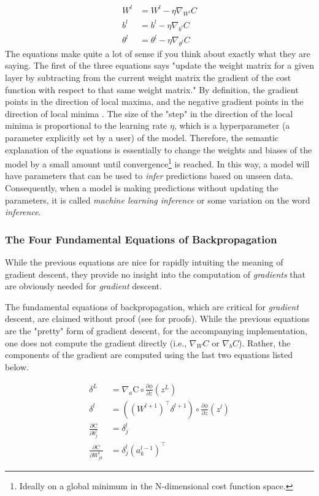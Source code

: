 \documentclass{article}
\begin{document}
\begin{align}
	W^{l}      & = W^{l} - \eta \nabla_{W^{l}}C           \\
	b^{l}      & = b^{l} - \eta \nabla_{b^{l}}C           \\
	\theta^{l} & = \theta^{l} - \eta \nabla_{\theta^{l}}C
\end{align}
The equations make quite a lot of sense if you think about exactly
what they are saying. The first of the three equations says "update the
weight matrix for a given layer by subtracting from the current weight matrix
the gradient of the cost function with respect to that same weight matrix." By definition,
the gradient points in the direction of local maxima, and the
negative gradient points in the direction of local minima \cite{MathLibreGradient2021}.
The size of the "step" in the direction of the local minima
is proportional to the learning rate $\eta$,
which is a hyperparameter (a parameter explicitly set by a user) of the model.
Therefore, the semantic explanation of the equations is essentially to change the
weights and biases of the model by a small amount until convergence\footnote{Ideally
	on a global minimum in the N-dimensional cost function space.} is reached. In this way, a model
will have parameters that can be used to \textit{infer} predictions based on
unseen data. Consequently, when a model is making predictions without
updating the parameters, it is called \textit{machine learning inference} or
some variation on the word \textit{inference}.

\subsubsection{The Four Fundamental Equations of Backpropagation}

\quad While the previous equations are nice for rapidly intuiting the meaning of
gradient descent, they provide no insight into the computation of \textit{gradients}
that are obviously needed for \textit{gradient} descent.

The fundamental equations of backpropagation, which are critical for \textit{gradient}
descent, are claimed without proof (see \cite{Nielsen2015} for proofs). While
the previous equations are the "pretty" form of gradient descent, for the
accompanying implementation, one does not compute the gradient directly (i.e.,
$\nabla_{W}C$ or $\nabla_{b}C$). Rather,
the components of the gradient are computed using the last two equations listed
below.

\begin{align}
	\delta^{L}                                    & = \nabla_{a} \text{C} \circ \frac{\partial \phi}{\partial z}(z^{L})             \\
	\delta^{l}                                    & = ((W^{l+1})^{\top} \delta^{l+1}) \circ \frac{\partial \phi}{\partial z}(z^{l}) \\
	\frac{\partial \text{C}}{\partial b_j^{l}}    & = \delta_j^{l}                                                                  \\
	\frac{\partial \text{C}}{\partial W_{jk}^{l}} & = \delta_{j}^{l} (a_{k}^{l-1})^{\top}
\end{align}
\end{document}
